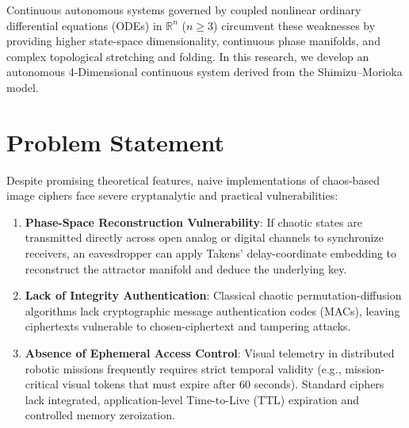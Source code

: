 \documentclass[12pt,a4paper,oneside]{report}
\begin{document}
Continuous autonomous systems governed by coupled nonlinear ordinary differential equations (ODEs) in $\mathbb{R}^n$ ($n \ge 3$) circumvent these weaknesses by providing higher state-space dimensionality, continuous phase manifolds, and complex topological stretching and folding. In this research, we develop an autonomous 4-Dimensional continuous system derived from the Shimizu--Morioka model.

\section{Problem Statement}
Despite promising theoretical features, naive implementations of chaos-based image ciphers face severe cryptanalytic and practical vulnerabilities:
\begin{enumerate}
    \item \textbf{Phase-Space Reconstruction Vulnerability}: If chaotic states are transmitted directly across open analog or digital channels to synchronize receivers, an eavesdropper can apply Takens' delay-coordinate embedding to reconstruct the attractor manifold and deduce the underlying key.
    \item \textbf{Lack of Integrity Authentication}: Classical chaotic permutation-diffusion algorithms lack cryptographic message authentication codes (MACs), leaving ciphertexts vulnerable to chosen-ciphertext and tampering attacks.
    \item \textbf{Absence of Ephemeral Access Control}: Visual telemetry in distributed robotic missions frequently requires strict temporal validity (e.g., mission-critical visual tokens that must expire after 60 seconds). Standard ciphers lack integrated, application-level Time-to-Live (TTL) expiration and controlled memory zeroization.
\end{enumerate}
\end{document}
